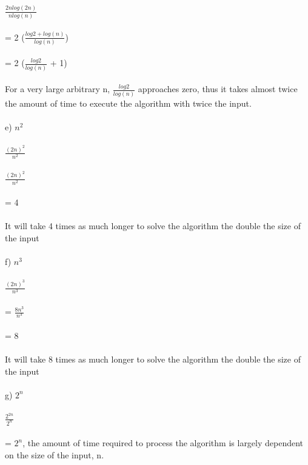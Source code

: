 \documentclass{article}
\begin{document}
{$\frac{2nlog(2n)}{n log (n)}$\\ \\
= 2 ($\frac{log2 + log(n)}{log (n)}$)\\ \\
= 2 ($\frac{log2}{log (n)}$ + 1) \\\\
For a very large arbitrary n, $\frac{log2}{log (n)}$ approaches zero, thus it takes almost twice the amount of time to execute the algorithm with twice the input. \\\\
e) $n^2$ \\ \\ 
$\frac{(2n)^2}{n^2}$ \\\\
$\frac{(2n)^2}{n^2}$  \\\\
= 4 \\\\
It will take 4 times as much longer to solve the algorithm the double the size of the input  \\\\
f)  $n^3$ \\ \\ 
$\frac{(2n)^3}{n^3}$ \\\\
= $\frac{8n^3}{n^3}$ \\\\
= 8 \\\\
It will take 8 times as much longer to solve the algorithm the double the size of the input \\\\
g) $2^n$ \\ \\ 
$\frac{2^{2n}}{2^n}$ \\\\
= $2^n$, the amount of time required to process the algorithm is largely dependent on the size of the input, n. 
\newpage
}
\end{document}

